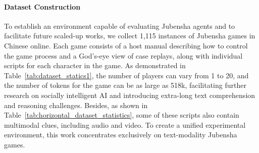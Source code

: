 \documentclass[11pt]{article}
\begin{document}
\paragraph{Dataset Construction}
To establish an environment capable of evaluating Jubensha agents and to facilitate future scaled-up works, we collect 1,115 instances of Jubensha games in Chinese online.  Each game consists of a host manual describing how to control the game process and a God's-eye view of case replays, along with individual scripts for each character in the game. As demonstrated in Table~\ref{tab:dataset_statics1}, the number of players can vary from 1 to 20, and the number of tokens for the game can be as large as 518k, facilitating further research on socially intelligent AI and introducing extra-long text comprehension and reasoning challenges. Besides, as shown in Table~\ref{tab:horizontal_dataset_statistics}, some of these scripts also contain multimodal clues, including audio and video. To create a unified experimental environment, this work concentrates exclusively on text-modality Jubensha games.




\end{document}
